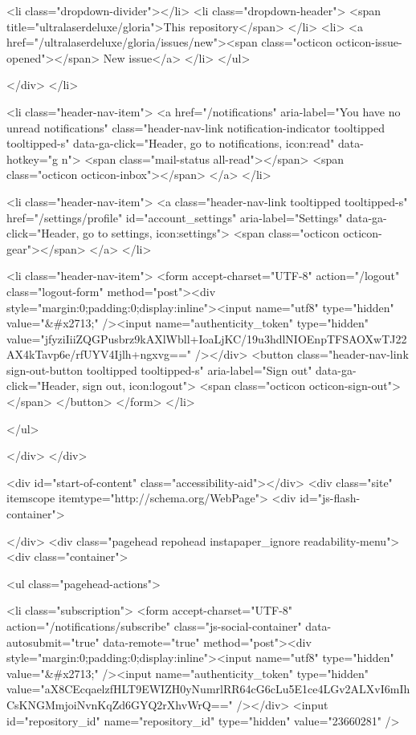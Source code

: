     <li class="dropdown-divider"></li>
    <li class="dropdown-header">
      <span title="ultralaserdeluxe/gloria">This repository</span>
    </li>
      <li>
        <a href="/ultralaserdeluxe/gloria/issues/new"><span class="octicon octicon-issue-opened"></span> New issue</a>
      </li>
</ul>

    </div>
  </li>

  <li class="header-nav-item">
        <a href="/notifications" aria-label="You have no unread notifications" class="header-nav-link notification-indicator tooltipped tooltipped-s" data-ga-click="Header, go to notifications, icon:read" data-hotkey="g n">
        <span class="mail-status all-read"></span>
        <span class="octicon octicon-inbox"></span>
</a>
  </li>

  <li class="header-nav-item">
    <a class="header-nav-link tooltipped tooltipped-s" href="/settings/profile" id="account_settings" aria-label="Settings" data-ga-click="Header, go to settings, icon:settings">
      <span class="octicon octicon-gear"></span>
    </a>
  </li>

  <li class="header-nav-item">
    <form accept-charset="UTF-8" action="/logout" class="logout-form" method="post"><div style="margin:0;padding:0;display:inline"><input name="utf8" type="hidden" value="&#x2713;" /><input name="authenticity_token" type="hidden" value="jfyziIiiZQGPusbrz9kAXlWbll+IoaLjKC/19u3hdlNIOEnpTFSAOXwTJ22AX4kTavp6e/rfUYV4Ijlh+ngxvg==" /></div>
      <button class="header-nav-link sign-out-button tooltipped tooltipped-s" aria-label="Sign out" data-ga-click="Header, sign out, icon:logout">
        <span class="octicon octicon-sign-out"></span>
      </button>
</form>  </li>

</ul>


    
  </div>
</div>

      

        


      <div id="start-of-content" class="accessibility-aid"></div>
          <div class="site" itemscope itemtype="http://schema.org/WebPage">
    <div id="js-flash-container">
      
    </div>
    <div class="pagehead repohead instapaper_ignore readability-menu">
      <div class="container">
        
<ul class="pagehead-actions">

    <li class="subscription">
      <form accept-charset="UTF-8" action="/notifications/subscribe" class="js-social-container" data-autosubmit="true" data-remote="true" method="post"><div style="margin:0;padding:0;display:inline"><input name="utf8" type="hidden" value="&#x2713;" /><input name="authenticity_token" type="hidden" value="aX8CEcqaelzfHLT9EWIZH0yNumrlRR64cG6cLu5E1ce4LGv2ALXvI6mIhCsKNGMmjoiNvnKqZd6GYQ2rXhvWrQ==" /></div>  <input id="repository_id" name="repository_id" type="hidden" value="23660281" />

